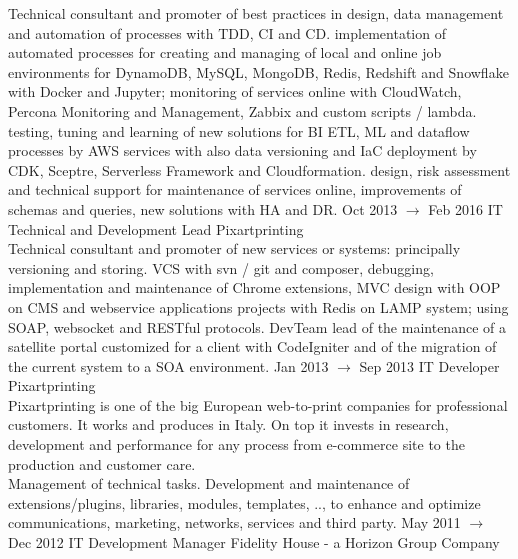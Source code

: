 \documentclass[8pt]{stackoverflow-upgraded-version} %
\begin{document}
\begin{entrylist}
{		 Technical consultant and promoter of best practices in design, data management and automation of processes with TDD, CI and CD.
		 implementation of automated processes for creating and managing of local and online job environments for DynamoDB, MySQL, MongoDB, Redis, Redshift and Snowflake with Docker and Jupyter; monitoring of services online with CloudWatch, Percona Monitoring and Management, Zabbix and custom scripts / lambda.
		 testing, tuning and learning of new solutions for BI ETL, ML and dataflow processes by AWS services with also data versioning and IaC deployment by CDK, Sceptre, Serverless Framework and Cloudformation.
		 design, risk assessment and technical support for maintenance of services online, improvements of schemas and queries, new solutions with HA and DR.}
	\entry
		{Oct 2013 $\rightarrow$ Feb 2016}
		{IT Technical and Development Lead}
		{Pixartprinting}
		{\\
		 Technical consultant and promoter of new services or systems: principally versioning and storing.
		 VCS with svn / git and composer, debugging, implementation and maintenance of Chrome extensions, MVC design with OOP
		on CMS and webservice applications projects with Redis on LAMP system; using SOAP, websocket and RESTful protocols.
		 DevTeam lead of the maintenance of a satellite portal customized for a client with CodeIgniter and of the migration of
		the current system to a SOA environment.}
	\entry
		{Jan 2013 $\rightarrow$ Sep 2013}
		{IT Developer}
		{Pixartprinting}
		{\\
		 Pixartprinting is one of the big European web-to-print companies for professional customers. It works
		and produces in Italy. On top it invests in research, development and performance for any process from e-commerce site to
		the production and customer care.\vspace{1mm}\\
		 Management of technical tasks. Development and maintenance of extensions/plugins, libraries, modules,
		templates, .., to enhance and optimize communications, marketing, networks, services and third party.}
	\entry
		{May 2011 $\rightarrow$ Dec 2012}
		{IT Development Manager}
		{Fidelity House - a Horizon Group Company}

\end{entrylist}
\end{document}
